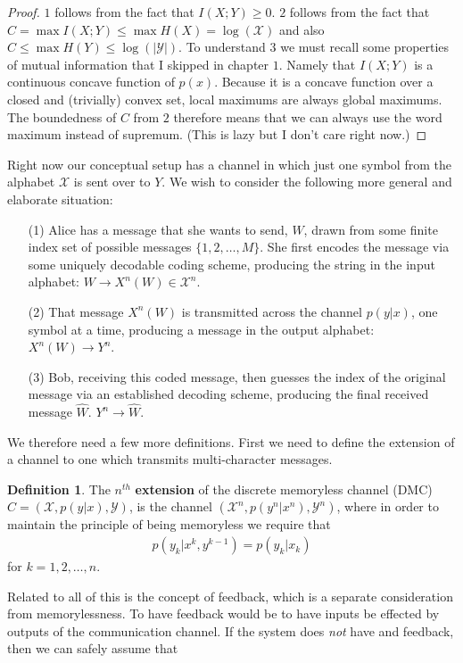 \documentclass{article}
\theoremstyle{definition}
\newtheorem{definition}{Definition}[section]
\theoremstyle{plain}
\begin{document}
\begin{proof}
	$1$ follows from the fact that $I(X;Y) \geq 0$. $2$ follows from the fact that $C = \max I(X;Y) \leq \max H(X) = \log(\mathcal{X})$ and also $C \leq \max H(Y) \leq  \log(|\mathcal{Y}|)$. To understand $3$ we must recall some properties of mutual information that I skipped in chapter $1$. Namely that $I(X;Y)$ is a continuous concave function of $p(x)$. Because it is a concave function over a closed and (trivially) convex set, local maximums are always global maximums. The boundedness of $C$ from $2$ therefore means that we can always use the word maximum instead of supremum. (This is lazy but I don't care right now.) 
\end{proof}
Right now our conceptual setup has a channel in which just one symbol from the alphabet $\mathcal{X}$ is sent over to $Y$. We wish to consider the following more general and elaborate situation:
\begin{itemize}
	\item[(1)] Alice has a message that she wants to send, $W$, drawn from some finite index set of possible messages $\{1,2,\ldots,M\}$. She first encodes the message via some uniquely decodable coding scheme, producing the string in the input alphabet: $W \to X^n(W) \in \mathcal{X}^n$. 
	\item[(2)] That message $X^n(W)$ is transmitted across the channel $p(y|x)$, one symbol at a time, producing a message in the output alphabet: $X^n(W) \to Y^n$. \\
	\item[(3)] Bob, receiving this coded message, then guesses the index of the original message via an established decoding scheme, producing the final received message $\hat{W}$. $Y^n \to \hat{W}$. 
\end{itemize}
We therefore need a few more definitions. First we need to define the extension of a channel to one which transmits multi-character messages.
\begin{definition}
	The $n^{th}$ \textbf{extension} of the discrete memoryless channel (DMC) $C = (\mathcal{X},p(y|x),\mathcal{Y})$, is the channel $(\mathcal{X}^n,p(y^n|x^n),\mathcal{Y}^n)$, where in order to maintain the principle of being memoryless we require that 
	\begin{align}
		p(y_k|x^k,y^{k-1}) = p(y_k|x_k)
	\end{align}
	for $k = 1,2,\ldots,n$. 
\end{definition}
Related to all of this is the concept of feedback, which is a separate consideration from memorylessness. To have feedback would be to have inputs be effected by outputs of the communication channel. If the system does \emph{not} have and feedback, then we can safely assume that 
\end{document}
